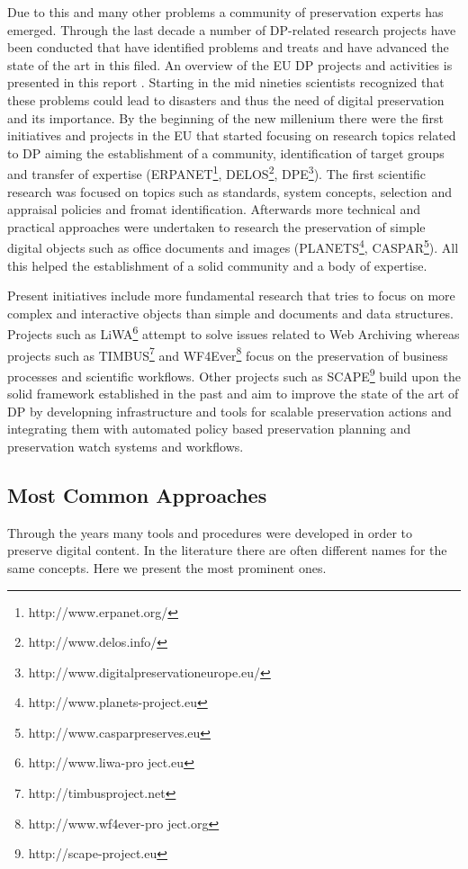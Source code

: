 Due to this and many other problems a community of preservation experts has emerged. Through the last decade a number of DP-related research projects have been conducted that have identified problems and treats and have advanced the state of the art in this filed. An overview of the EU DP projects and activities is presented in this report \cite{strodl:2011:dpreport}. Starting in the mid nineties scientists recognized that these problems could lead to disasters and thus the need of digital preservation and its importance. By the beginning of the new millenium there were the first initiatives and projects in the EU that started focusing on research topics related to DP aiming the establishment of a community, identification of target groups and transfer of expertise (ERPANET\footnote{http://www.erpanet.org/}, DELOS\footnote{http://www.delos.info/}, DPE\footnote{http://www.digitalpreservationeurope.eu/}). The first scientific research was focused on topics such as standards, system concepts, selection and appraisal policies and fromat identification. Afterwards more technical and practical approaches were undertaken to research the preservation of simple digital objects such as office documents and images (PLANETS\footnote{http://www.planets-project.eu}, CASPAR\footnote{http://www.casparpreserves.eu}). All this helped the establishment of a solid community and a body of expertise.

Present initiatives include more fundamental research that tries to focus on more complex and interactive objects than simple and documents and data structures. Projects such as LiWA\footnote{http://www.liwa-pro ject.eu} attempt to solve issues related to Web Archiving whereas projects such as TIMBUS\footnote{http://timbusproject.net} and WF4Ever\footnote{http://www.wf4ever-pro ject.org} focus on the preservation of business processes and scientific workflows.
Other projects such as SCAPE\footnote{http://scape-project.eu} build upon the solid framework established in the past and aim to improve the state of the art of DP by developning infrastructure and tools for scalable preservation actions and integrating them with automated policy based preservation planning and preservation watch systems and workflows.
\subsection{Most Common Approaches}
Through the years many tools and procedures were developed in order to preserve digital content. In the literature there are often different names for the same concepts. Here we present the most prominent ones. \newline

